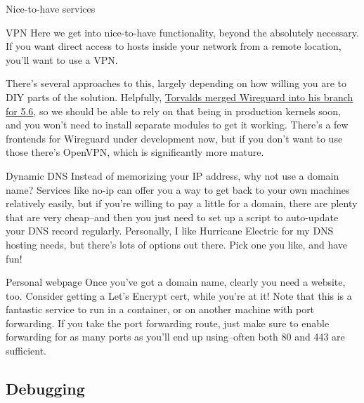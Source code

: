 \documentclass[bigger]{beamer}
\begin{document}
\begin{frame}[label={sec:org79d4237}]{Nice-to-have services}
\begin{block}{VPN}
Here we get into nice-to-have functionality, beyond the absolutely necessary. If
you want direct access to hosts inside your network from a remote location,
you'll want to use a VPN.

There's several approaches to this, largely depending on how willing you are to
DIY parts of the solution. Helpfully, \href{https://git.kernel.org/pub/scm/linux/kernel/git/torvalds/linux.git/commit/?id=bd2463ac7d7ec51d432f23bf0e893fb371a908cd}{Torvalds merged Wireguard into his branch
for 5.6}, so we should be able to rely on that being in production kernels soon,
and you won't need to install separate modules to get it working. There's a few
frontends for Wireguard under development now, but if you don't want to use
those there's OpenVPN, which is significantly more mature.
\end{block}

\begin{block}{Dynamic DNS}
Instead of memorizing your IP address, why not use a domain name? Services like
no-ip can offer you a way to get back to your own machines relatively easily,
but if you're willing to pay a little for a domain, there are plenty that are
very cheap--and then you just need to set up a script to auto-update your DNS
record regularly. Personally, I like Hurricane Electric for my DNS hosting
needs, but there's lots of options out there. Pick one you like, and have fun!
\end{block}

\begin{block}{Personal webpage}
Once you've got a domain name, clearly you need a website, too. Consider getting
a Let's Encrypt cert, while you're at it! Note that this is a fantastic service
to run in a container, or on another machine with port forwarding. If you take
the port forwarding route, just make sure to enable forwarding for as many ports
as you'll end up using--often both 80 and 443 are sufficient.
\end{block}
\end{frame}


\subsection{Debugging}
\label{sec:orgedb5cb4}
\end{document}

